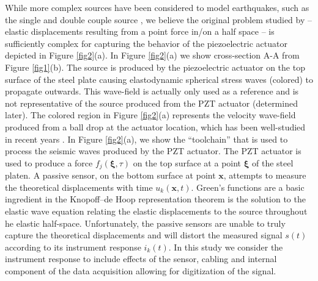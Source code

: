 \documentclass[preprint,3p, 11pt,authoryear]{elsarticle}
\begin{document}
While more complex sources have been considered to model earthquakes, such as the single and double couple source \citet{Sato1972}, we believe the original problem studied by \citet{Lamb1904} -- elastic displacements resulting from a point force in/on a half space -- is sufficiently complex for capturing the behavior of the piezoelectric actuator depicted in Figure \ref{fig2}(a).  In Figure \ref{fig2}(a) we show cross-section A-A from Figure \ref{fig1}(b). The source is produced by the piezoelectric actuator on the top surface of the steel plate causing elastodynamic spherical stress waves (colored) to propagate outwards. This wave-field is actually only used as a reference and is not representative of the source produced from the PZT actuator (determined later). The colored region in Figure \ref{fig2}(a) represents the velocity wave-field produced from a ball drop at the actuator location, which has been well-studied in recent years \citet{McLaskey2010, Wu2018, Wu2020}. In Figure \ref{fig2}(a), we show the ``toolchain'' that is used to process the seismic waves produced by the PZT actuator. The PZT actuator is used to produce a force $f_{j}\left( \mathbf{\xi}, \tau \right)$ on the top surface at a point $\mathbf{\xi}$ of the steel platen. A passive sensor, on the bottom surface at point $\mathbf{x}$, attempts to measure the theoretical displacements with time $u_{k}\left( \mathbf{x}, t \right)$. Green’s functions are a basic ingredient in the Knopoff--de Hoop representation theorem \citep{Burridge1964} is the solution to the elastic wave equation relating the elastic displacements to the source throughout he elastic half-space. Unfortunately, the passive sensors are unable to truly capture the theoretical displacements and will distort the measured signal $s(t)$ according to its instrument response $i_{k}(t)$.  In this study we consider the instrument response to include effects of the sensor, cabling and internal component of the data acquisition allowing for digitization of the signal. 
\end{document}
